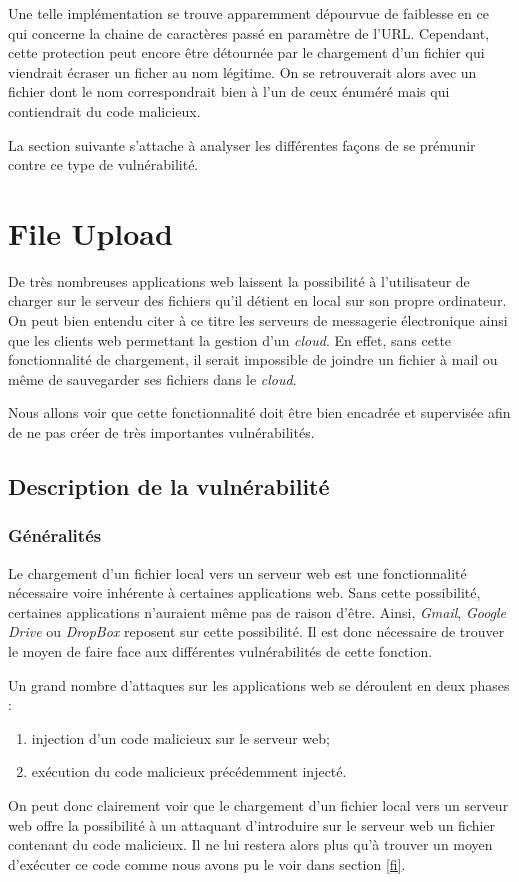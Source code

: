 Une telle implémentation se trouve apparemment dépourvue de faiblesse en ce qui concerne la chaine de caractères passé en paramètre de l'URL. Cependant, cette protection peut encore être détournée par le chargement d'un fichier qui viendrait écraser un ficher au nom légitime. On se retrouverait alors avec un fichier dont le nom correspondrait bien à l'un de ceux énuméré mais qui contiendrait du code malicieux. 

La section suivante s'attache à analyser les différentes façons de se prémunir contre ce type de vulnérabilité.

\clearpage

\newpage

\section{File Upload}
\label{fu}

De très nombreuses applications web laissent la possibilité à l'utilisateur de charger sur le serveur des fichiers qu'il détient en local sur son propre ordinateur. On peut bien entendu citer à ce titre les serveurs de messagerie électronique ainsi que les clients web permettant la gestion d'un \textit{cloud}. En effet, sans cette fonctionnalité de chargement, il serait impossible de joindre un fichier à mail ou même de sauvegarder ses fichiers dans le \textit{cloud}. 

Nous allons voir que cette fonctionnalité doit être bien encadrée et supervisée afin de ne pas créer de très importantes vulnérabilités.

\subsection{Description de la vulnérabilité}

\subsubsection{Généralités}

Le chargement d'un fichier local vers un serveur web est une fonctionnalité nécessaire voire inhérente à certaines applications web. Sans cette possibilité, certaines applications n'auraient même pas de raison d'être. Ainsi, \textit{Gmail}, \textit{Google Drive} ou \textit{DropBox} reposent sur cette possibilité. Il est donc nécessaire de trouver le moyen de faire face aux différentes vulnérabilités de cette fonction.

Un grand nombre d'attaques sur les applications web se déroulent en deux phases :
\begin{enumerate}
\item injection d'un code malicieux sur le serveur web;
\item exécution du code malicieux précédemment injecté.
\end{enumerate} 
On peut donc clairement voir que le chargement d'un fichier local vers un serveur web offre la possibilité à un attaquant d'introduire sur le serveur web un fichier contenant du code malicieux. Il ne lui restera alors plus qu'à trouver un moyen d'exécuter ce code comme nous avons pu le voir dans section \ref{fi}.


